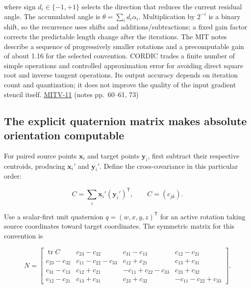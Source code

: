 where sign \(d_i\in\{-1,+1\}\) selects the direction that reduces the current residual angle. The accumulated angle is \(\theta=\sum_i d_i\alpha_i\). Multiplication by \(2^{-i}\) is a binary shift, so the recurrence uses shifts and additions/subtractions; a fixed gain factor corrects the predictable length change after the iterations. The MIT notes describe a sequence of progressively smaller rotations and a precomputable gain of about 1.16 for the selected convention. CORDIC trades a finite number of simple operations and controlled approximation error for avoiding direct square root and inverse tangent operations. Its output accuracy depends on iteration count and quantization; it does not improve the quality of the input gradient stencil itself. \hyperref[04-visual-computing-ii-ch036-mitv-11---edge-detection-subpixel-position-cordic-line-detection-us-6408109]{MITV-11} (notes pp.~60--61, 73)

\subsection{The explicit quaternion matrix makes absolute orientation computable}\label{04-visual-computing-ii-ch032-the-explicit-quaternion-matrix-makes-absolute-orientation-computable}

\hypertarget{04-visual-computing-ii-ch032-the-explicit-quaternion-matrix-makes-absolute-orientation-computable}{}

For paired source points \(\mathbf x_i\) and target points \(\mathbf y_i\), first subtract their respective centroids, producing \(\mathbf x_i'\) and \(\mathbf y_i'\). Define the cross-covariance in this particular order:

\[
C=\sum_i\mathbf x_i'(\mathbf y_i')^{\mathsf T},\qquad C=(c_{jk}).
\]

Use a scalar-first unit quaternion \(q=(w,x,y,z)^{\mathsf T}\) for an active rotation taking source coordinates toward target coordinates. The symmetric matrix for this convention is

\[
N=\begin{bmatrix}
\operatorname{tr}C&c_{23}-c_{32}&c_{31}-c_{13}&c_{12}-c_{21}\\
c_{23}-c_{32}&c_{11}-c_{22}-c_{33}&c_{12}+c_{21}&c_{13}+c_{31}\\
c_{31}-c_{13}&c_{12}+c_{21}&-c_{11}+c_{22}-c_{33}&c_{23}+c_{32}\\
c_{12}-c_{21}&c_{13}+c_{31}&c_{23}+c_{32}&-c_{11}-c_{22}+c_{33}
\end{bmatrix}.
\]

